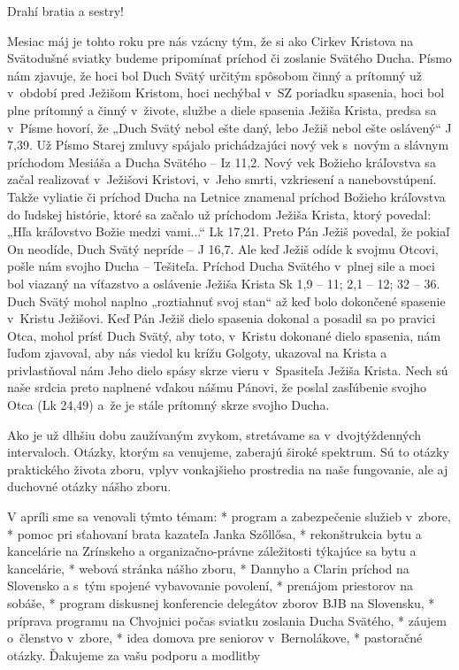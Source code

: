 


Drahí bratia a sestry!

Mesiac máj je tohto roku pre nás vzácny tým, že si ako Cirkev Kristova na Svätodušné sviatky budeme pripomínať príchod či zoslanie Svätého Ducha. Písmo nám zjavuje, že hoci bol Duch Svätý určitým spôsobom činný a prítomný už v~období pred Ježišom Kristom, hoci nechýbal v~SZ poriadku spasenia, hoci bol plne prítomný a činný v~živote, službe a diele spasenia Ježiša Krista, predsa sa v~Písme hovorí, že „Duch Svätý nebol ešte daný, lebo Ježiš nebol ešte oslávený“ J 7,39. Už Písmo Starej zmluvy spájalo prichádzajúci nový vek s~novým a slávnym príchodom Mesiáša a Ducha Svätého -- Iz 11,2. Nový vek Božieho kráľovstva sa začal realizovať v~Ježišovi Kristovi, v~Jeho smrti, vzkriesení a nanebovstúpení. Takže vyliatie či príchod Ducha na Letnice znamenal príchod Božieho kráľovstva do ľudskej histórie, ktoré sa začalo už príchodom Ježiša Krista, ktorý povedal: „Hľa kráľovstvo Božie medzi vami...“ Lk 17,21. Preto Pán Ježiš povedal, že pokiaľ On neodíde, Duch Svätý nepríde -- J 16,7. Ale keď Ježiš odíde k svojmu Otcovi, pošle nám svojho Ducha -- Tešiteľa. Príchod Ducha Svätého v~plnej sile a moci bol viazaný na víťazstvo a oslávenie Ježiša Krista Sk 1,9 -- 11; 2,1 -- 12; 32 -- 36. Duch Svätý mohol naplno „roztiahnuť svoj stan“ až keď bolo dokončené spasenie v~Kristu Ježišovi. Keď Pán Ježiš dielo spasenia dokonal a posadil sa po pravici Otca, mohol prísť Duch Svätý, aby toto, v~Kristu dokonané dielo spasenia, nám ľuďom zjavoval, aby nás viedol ku krížu Golgoty, ukazoval na Krista a privlastňoval nám Jeho dielo spásy skrze vieru v~Spasiteľa Ježiša Krista. Nech sú naše srdcia preto naplnené vďakou nášmu Pánovi, že poslal zasľúbenie svojho Otca (Lk 24,49) a~že je stále prítomný skrze svojho Ducha.



Ako je už dlhšiu dobu zaužívaným zvykom, stretávame sa v~dvojtýždenných intervaloch. Otázky, ktorým sa venujeme, zaberajú široké spektrum. Sú to otázky praktického života zboru, vplyv vonkajšieho prostredia na naše fungovanie, ale aj duchovné otázky nášho zboru.

V apríli sme sa venovali týmto témam:
\begitems
* program a zabezpečenie služieb v~zbore,
* pomoc pri sťahovaní brata kazateľa Janka Szőllősa,
* rekonštrukcia bytu a kancelárie na Zrínskeho a organizačno-právne záležitosti týkajúce sa bytu a kancelárie,
* webová stránka nášho zboru,
* Dannyho a Clarin príchod na Slovensko a s~tým spojené vybavovanie povolení,
* prenájom priestorov na sobáše,
* program diskusnej konferencie delegátov zborov BJB na Slovensku,
* príprava programu na Chvojnici počas sviatku zoslania Ducha Svätého,
* záujem o~členstvo v~zbore,
* idea domova pre seniorov v~Bernolákove,
* pastoračné otázky.
\enditems
Ďakujeme za vašu podporu a modlitby

